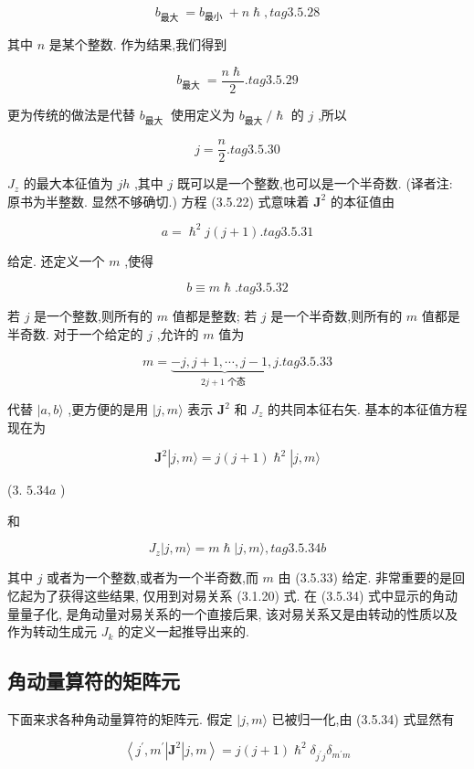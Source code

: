 $$
{b}_{\text{最大 }} = {b}_{\text{最小 }} + n\hslash , tag{3. 5.28}
$$

其中 $n$ 是某个整数. 作为结果,我们得到

$$
{b}_{\text{最大 }} = \frac{n\hslash }{2}. tag{3. 5.29}
$$

更为传统的做法是代替 ${b}_{\text{最大 }}$ 使用定义为 ${b}_{\text{最大 }}/\hslash$ 的 $j$ ,所以

$$
j = \frac{n}{2}. tag{3. 5.30}
$$

${J}_{z}$ 的最大本征值为 ${jh}$ ,其中 $j$ 既可以是一个整数,也可以是一个半奇数. (译者注: 原书为半整数. 显然不够确切.) 方程 (3.5.22) 式意味着 ${\mathbf{J}}^{2}$ 的本征值由

$$
a = {\hslash }^{2}j\left( {j + 1}\right) . tag{3. 5.31}
$$

给定. 还定义一个 $m$ ,使得

$$
b \equiv m\hslash . tag{3. 5.32}
$$

若 $j$ 是一个整数,则所有的 $m$ 值都是整数; 若 $j$ 是一个半奇数,则所有的 $m$ 值都是半奇数. 对于一个给定的 $j$ ,允许的 $m$ 值为

$$
m = \underset{{2j} + 1\text{ 个态 }}{\underbrace{-j, j + 1,\cdots, j - 1, j}}. tag{3. 5.33}
$$

代替 $|a, b\rangle$ ,更方便的是用 $|j, m\rangle$ 表示 ${\mathbf{J}}^{2}$ 和 ${J}_{z}$ 的共同本征右矢. 基本的本征值方程现在为

$$
{\mathbf{J}}^{2}\left| {j, m\rangle = j\left( {j + 1}\right) {\hslash }^{2}}\right| j, m\rangle
$$

(3. ${5.34a}$ )

和

$$
{J}_{z}\left| {j, m\rangle = m\hslash }\right| j, m\rangle , tag{3. 5.34b}
$$

其中 $j$ 或者为一个整数,或者为一个半奇数,而 $m$ 由 (3.5.33) 给定. 非常重要的是回忆起为了获得这些结果, 仅用到对易关系 (3.1.20) 式. 在 (3.5.34) 式中显示的角动量量子化, 是角动量对易关系的一个直接后果, 该对易关系又是由转动的性质以及作为转动生成元 ${J}_{k}$ 的定义一起推导出来的.

\subsection{角动量算符的矩阵元}
下面来求各种角动量算符的矩阵元. 假定 $|j, m\rangle$ 已被归一化,由 (3.5.34) 式显然有

$$
\left\langle {{j}^{\prime },{m}^{\prime }\left| {\mathbf{J}}^{2}\right| j, m}\right\rangle = j\left( {j + 1}\right) {\hslash }^{2}{\delta }_{{j}^{\prime }j}{\delta }_{{m}^{\prime }m}
$$

